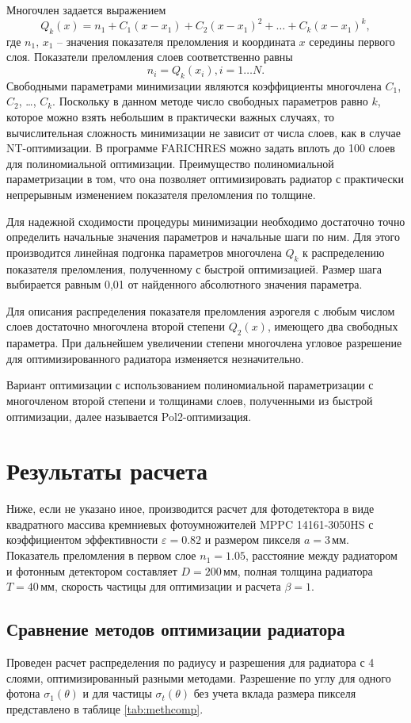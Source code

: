 \documentclass[12pt]{article}
\begin{document}
Многочлен задается выражением
\[ Q_k(x) = n_1 + C_1(x-x_1) + C_2(x-x_1)^2 + \ldots + C_k(x-x_1)^k, \]
где $n_1,\,x_1$ -- значения показателя преломления и координата $x$ середины первого слоя. Показатели преломления слоев соответственно равны
\[ n_i = Q_k(x_i), i=1\ldots N. \]
Свободными параметрами минимизации являются коэффициенты многочлена $C_1$, $C_2$, \ldots, $C_k$. Поскольку в данном методе число 
свободных параметров равно $k$, которое можно взять небольшим в практически важных случаях, то вычислительная сложность минимизации 
не зависит от числа слоев, как в случае NT-оптимизации. В программе FARICHRES можно задать вплоть до 100 слоев для полиномиальной оптимизации. 
Преимущество полиномиальной параметризации в том, что она позволяет оптимизировать радиатор с практически непрерывным изменением показателя преломления по толщине.

Для надежной сходимости процедуры минимизации необходимо достаточно точно определить начальные значения
параметров и начальные шаги по ним. Для этого производится линейная подгонка параметров многочлена $Q_k$ к распределению показателя преломления,
полученному с быстрой оптимизацией. Размер шага выбирается равным 0,01 от найденного абсолютного значения параметра.

Для описания распределения показателя преломления аэрогеля с любым числом слоев достаточно многочлена второй степени $Q_2(x)$, имеющего два свободных параметра. 
При дальнейшем увеличении степени многочлена угловое разрешение для оптимизированного радиатора изменяется незначительно.

Вариант оптимизации с использованием полиномиальной параметризации с многочленом второй степени и толщинами слоев, полученными из быстрой 
оптимизации, далее называется Pol2-оптимизация.

\section{Результаты расчета}
Ниже, если не указано иное, производится расчет для фотодетектора в виде квадратного массива кремниевых фотоумножителей 
MPPC 14161-3050HS с коэффициентом эффективности $\varepsilon=0.82$ и размером пикселя $a=3$\,мм. 
Показатель преломления в первом слое $n_1=1.05$, расстояние между радиатором и фотонным детектором составляет $D=200$\,мм, полная толщина радиатора $T=40$\,мм, 
скорость частицы для оптимизации и расчета $\beta=1$.

\subsection{Сравнение методов оптимизации радиатора}
Проведен расчет распределения по радиусу и разрешения для радиатора с 4 слоями, оптимизированный разными методами. Разрешение по углу для одного фотона 
$\sigma_1(\theta)$ и для частицы $\sigma_t(\theta)$ без учета вклада размера пикселя представлено в таблице \ref{tab:methcomp}. 
\end{document}
